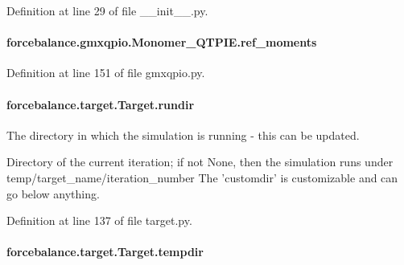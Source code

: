 Definition at line 29 of file \-\_\-\-\_\-init\-\_\-\-\_\-.\-py.

\hypertarget{classforcebalance_1_1gmxqpio_1_1Monomer__QTPIE_a17de0cabe736ba52ae17f8476db7d35a}{
\paragraph[{ref\-\_\-moments}]{\setlength{\rightskip}{0pt plus 5cm}forcebalance.\-gmxqpio.\-Monomer\-\_\-\-Q\-T\-P\-I\-E.\-ref\-\_\-moments}}\label{classforcebalance_1_1gmxqpio_1_1Monomer__QTPIE_a17de0cabe736ba52ae17f8476db7d35a}


Definition at line 151 of file gmxqpio.\-py.

\hypertarget{classforcebalance_1_1target_1_1Target_a6872de5b2d4273b82336ea5b0da29c9e}{
\paragraph[{rundir}]{\setlength{\rightskip}{0pt plus 5cm}forcebalance.\-target.\-Target.\-rundir\hspace{0.3cm}{\ttfamily [inherited]}}}\label{classforcebalance_1_1target_1_1Target_a6872de5b2d4273b82336ea5b0da29c9e}


The directory in which the simulation is running -\/ this can be updated. 

Directory of the current iteration; if not None, then the simulation runs under temp/target\-\_\-name/iteration\-\_\-number The 'customdir' is customizable and can go below anything.

Definition at line 137 of file target.\-py.

\hypertarget{classforcebalance_1_1target_1_1Target_aa1f01b5b78db253b5b66384ed11ed193}{
\paragraph[{tempdir}]{\setlength{\rightskip}{0pt plus 5cm}forcebalance.\-target.\-Target.\-tempdir\hspace{0.3cm}{\ttfamily [inherited]}}}\label{classforcebalance_1_1target_1_1Target_aa1f01b5b78db253b5b66384ed11ed193}


